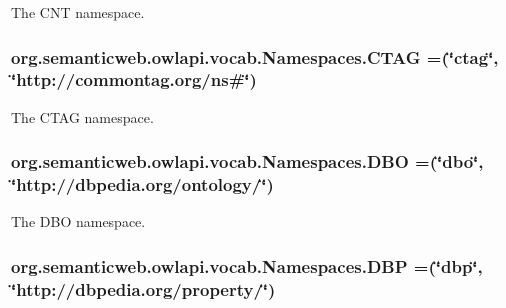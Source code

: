 The C\-N\-T namespace. \hypertarget{enumorg_1_1semanticweb_1_1owlapi_1_1vocab_1_1_namespaces_ac2c611b97eee5338d9c665915bb010e3}{
\subsubsection[{C\-T\-A\-G}]{\setlength{\rightskip}{0pt plus 5cm}org.\-semanticweb.\-owlapi.\-vocab.\-Namespaces.\-C\-T\-A\-G =(\char`\"{}ctag\char`\"{}, \char`\"{}http\-://commontag.\-org/{\bf ns}\#\char`\"{})}}\label{enumorg_1_1semanticweb_1_1owlapi_1_1vocab_1_1_namespaces_ac2c611b97eee5338d9c665915bb010e3}
The C\-T\-A\-G namespace. \hypertarget{enumorg_1_1semanticweb_1_1owlapi_1_1vocab_1_1_namespaces_a209365b93a48ae56e564d2b362c15e6f}{
\subsubsection[{D\-B\-O}]{\setlength{\rightskip}{0pt plus 5cm}org.\-semanticweb.\-owlapi.\-vocab.\-Namespaces.\-D\-B\-O =(\char`\"{}dbo\char`\"{}, \char`\"{}http\-://dbpedia.\-org/ontology/\char`\"{})}}\label{enumorg_1_1semanticweb_1_1owlapi_1_1vocab_1_1_namespaces_a209365b93a48ae56e564d2b362c15e6f}
The D\-B\-O namespace. \hypertarget{enumorg_1_1semanticweb_1_1owlapi_1_1vocab_1_1_namespaces_a81c384af1306cdb6e16992077cb7ed2d}{
\subsubsection[{D\-B\-P}]{\setlength{\rightskip}{0pt plus 5cm}org.\-semanticweb.\-owlapi.\-vocab.\-Namespaces.\-D\-B\-P =(\char`\"{}dbp\char`\"{}, \char`\"{}http\-://dbpedia.\-org/property/\char`\"{})}}\label{enumorg_1_1semanticweb_1_1owlapi_1_1vocab_1_1_namespaces_a81c384af1306cdb6e16992077cb7ed2d}
